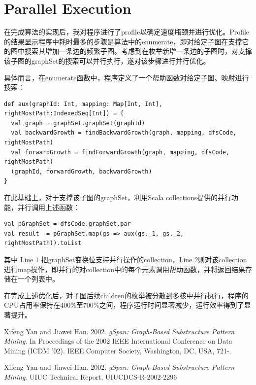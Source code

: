 \documentclass{article}
\begin{document}
\subsection{}
\section{Parallel Execution}

在完成算法的实现后，我对程序进行了profile以确定速度瓶颈并进行优化。Profile的结果显示程序中耗时最多的步骤是算法中的enumerate，即对给定子图在支撑它的图中搜索其增加一条边的频繁子图。考虑到在枚举新增一条边的子图时，对支撑该子图的graphSet的搜索可以并行执行，遂对该步骤进行并行优化。

具体而言，在enumerate函数中，程序定义了一个帮助函数对给定子图、映射进行搜索：
\begin{lstlisting}[style=mStyle]
def aux(graphId: Int, mapping: Map[Int, Int], rightMostPath:IndexedSeq[Int]) = {
  val graph = graphSet.graphSet(graphId)
  val backwardGrowth = findBackwardGrowth(graph, mapping, dfsCode, rightMostPath)
  val forwardGrowth = findForwardGrowth(graph, mapping, dfsCode, rightMostPath)
  (graphId, forwardGrowth, backwardGrowth)
}
\end{lstlisting}

在此基础上，对于支撑该子图的graphSet，利用Scala collections提供的并行功能，并行调用上述函数：

\begin{lstlisting}[style=mStyle]
val pGraphSet = dfsCode.graphSet.par
val result  = pGraphSet.map(gs => aux(gs._1, gs._2, rightMostPath)).toList
\end{lstlisting}

其中 Line 1 把graphSet变换位支持并行操作的collection，Line 2则对该collection进行map操作，即并行的对collection中的每个元素调用帮助函数，并将返回结果存储在一个列表中。

在完成上述优化后，对子图后续children的枚举被分散到多核中并行执行，程序的CPU占用率保持在400\%至700\%之间，程序运行时间显著减少，运行效率得到了显著提升。


\begin{thebibliography}{9}

  Xifeng Yan and Jiawei Han. 2002. \emph{gSpan: Graph-Based Substructure Pattern Mining}. In Proceedings of the 2002 IEEE International Conference on Data Mining (ICDM '02). IEEE Computer Society, Washington, DC, USA, 721-.


  Xifeng Yan and Jiawei Han. 2002. \emph{gSpan: Graph-Based Substructure Pattern Mining}. UIUC Technical Report, UIUCDCS-R-2002-2296

\end{thebibliography}
\end{document}
